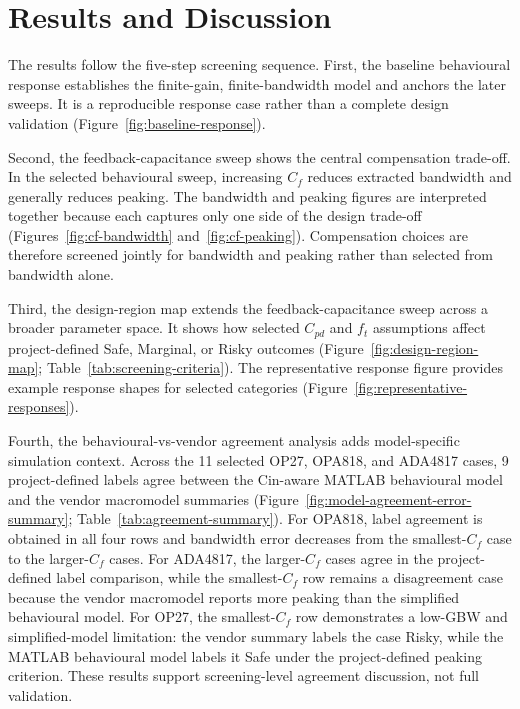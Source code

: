 \section{Results and Discussion}

The results follow the five-step screening sequence. First, the baseline behavioural response establishes the finite-gain, finite-bandwidth model and anchors the later sweeps. It is a reproducible response case rather than a complete design validation (Figure~\ref{fig:baseline-response}).

Second, the feedback-capacitance sweep shows the central compensation trade-off. In the selected behavioural sweep, increasing $C_f$ reduces extracted bandwidth and generally reduces peaking. The bandwidth and peaking figures are interpreted together because each captures only one side of the design trade-off (Figures~\ref{fig:cf-bandwidth} and~\ref{fig:cf-peaking}). Compensation choices are therefore screened jointly for bandwidth and peaking rather than selected from bandwidth alone.

Third, the design-region map extends the feedback-capacitance sweep across a broader parameter space. It shows how selected $C_{pd}$ and $f_t$ assumptions affect project-defined Safe, Marginal, or Risky outcomes (Figure~\ref{fig:design-region-map}; Table~\ref{tab:screening-criteria}). The representative response figure provides example response shapes for selected categories (Figure~\ref{fig:representative-responses}).

Fourth, the behavioural-vs-vendor agreement analysis adds model-specific simulation context. Across the 11 selected OP27, OPA818, and ADA4817 cases, 9 project-defined labels agree between the Cin-aware MATLAB behavioural model and the vendor macromodel summaries (Figure~\ref{fig:model-agreement-error-summary}; Table~\ref{tab:agreement-summary}). For OPA818, label agreement is obtained in all four rows and bandwidth error decreases from the smallest-$C_f$ case to the larger-$C_f$ cases. For ADA4817, the larger-$C_f$ cases agree in the project-defined label comparison, while the smallest-$C_f$ row remains a disagreement case because the vendor macromodel reports more peaking than the simplified behavioural model. For OP27, the smallest-$C_f$ row demonstrates a low-GBW and simplified-model limitation: the vendor summary labels the case Risky, while the MATLAB behavioural model labels it Safe under the project-defined peaking criterion. These results support screening-level agreement discussion, not full validation.

